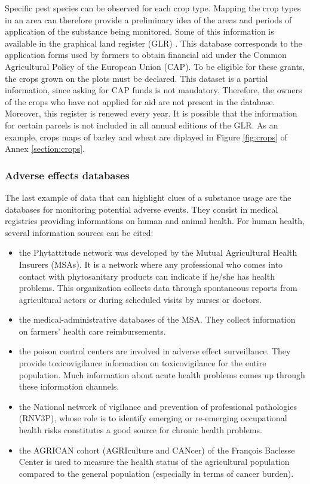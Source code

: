 Specific pest species can be observed for each crop type. Mapping the crop types in an area can therefore provide a preliminary idea of the areas and periods of application of the substance being monitored. Some of this information is available in the graphical land register (GLR) \cite{RPG}. This database corresponds to the application forms used by farmers to obtain financial aid under the Common Agricultural Policy of the European Union (CAP). To be eligible for these grants, the crops grown on the plots must be declared. This dataset is a partial information, since asking for CAP funds is not mandatory. Therefore, the owners of the crops who have not applied for aid are not present in the database. Moreover, this register is renewed every year. It is possible that the information for certain parcels is not included in all annual editions of the GLR. As an example, crops maps of barley and wheat are diplayed in Figure \ref{fig:crops} of Annex \ref{section:crops}.


\subsubsection{Adverse effects databases}

The last example of data that can highlight clues of a substance usage are the databases for monitoring potential adverse events. They consist in medical registries providing informations on human and animal health.  
For human health, several information sources can be cited: 
\begin{itemize}
\item the Phytattitude network was developed by the Mutual Agricultural Health Insurers (MSAs). It is a network where any professional who comes into contact with phytosanitary products can indicate if he/she has health problems. This organization collects data through spontaneous reports from agricultural actors or during scheduled visits by nurses or doctors.
\item the medical-administrative databases of the MSA. They collect information on farmers' health care reimbursements.
\item the poison control centers are involved in adverse effect surveillance. They provide toxicovigilance information on toxicovigilance for the entire population. Much information about acute health problems comes up through these information channels.
\item the National network of vigilance and prevention of professional pathologies (RNV3P), whose role is to identify emerging or re-emerging occupational health risks constitutes a good source for chronic health problems.
\item the AGRICAN cohort (AGRIculture and CANcer) of the François Baclesse Center is used to measure the health status of the agricultural population compared to the general population (especially in terms of cancer burden).
\end{itemize}

